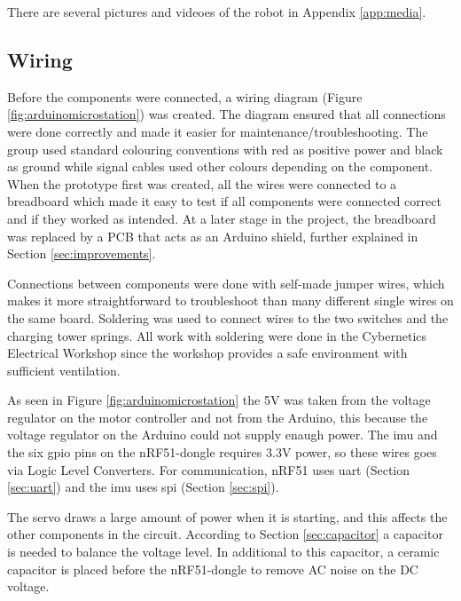 There are several pictures and videoes of the robot in Appendix \ref{app:media}.

\subsection{Wiring}
Before the components were connected, a wiring diagram (Figure \ref{fig:arduinomicrostation}) was created. The diagram ensured that all connections were done correctly and made it easier for maintenance/troubleshooting. The group used standard colouring conventions with red as positive power and black as ground while signal cables used other colours depending on the component. When the prototype first was created, all the wires were connected to a breadboard which made it easy to test if all components were connected correct and if they worked as intended. At a later stage in the project, the breadboard was replaced by a PCB that acts as an Arduino shield, further explained in Section \ref{sec:improvements}.

Connections between components were done with self-made jumper wires, which makes it more straightforward to troubleshoot than many different single wires on the same board. Soldering was used to connect wires to the two switches and the charging tower springs. All work with soldering were done in the Cybernetics Electrical Workshop since the workshop provides a safe environment with sufficient ventilation.

As seen in Figure \ref{fig:arduinomicrostation} the 5V was taken from the voltage regulator on the motor controller and not from the Arduino, this because the voltage regulator on the Arduino could not supply enaugh power. The \acrshort{imu} and the six \acrshort{gpio} pins on the nRF51-dongle requires 3.3V power, so these wires goes via Logic Level Converters. For communication, nRF51 uses \acrshort{uart} (Section \ref{sec:uart}) and the \acrshort{imu} uses \acrshort{spi} (Section \ref{sec:spi}).

The servo draws a large amount of power when it is starting, and this affects the other components in the circuit. According to Section \ref{sec:capacitor} a capacitor is needed to balance the voltage level. In additional to this capacitor, a ceramic capacitor is placed before the nRF51-dongle to remove AC noise on the DC voltage.